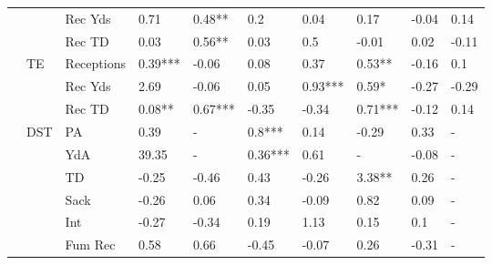 \documentclass[12pt]{article}
\begin{document}
\begin{table}[H]
\begin{adjustbox}{width =\textwidth}
\begin{tabular}{llllllllll}
{} &          &     Rec Yds &     0.71 &   0.48** &      0.2 &        0.04 &     0.17 &    -0.04 &      0.14 \\
{} &          &      Rec TD &     0.03 &   0.56** &     0.03 &         0.5 &    -0.01 &     0.02 &     -0.11 \\
{} &       TE &  Receptions &  0.39*** &    -0.06 &     0.08 &        0.37 &   0.53** &    -0.16 &       0.1 \\
{} &          &     Rec Yds &     2.69 &    -0.06 &     0.05 &     0.93*** &    0.59* &    -0.27 &     -0.29 \\
{} &          &      Rec TD &   0.08** &  0.67*** &    -0.35 &       -0.34 &  0.71*** &    -0.12 &      0.14 \\
{} &      DST &          PA &     0.39 &        - &   0.8*** &        0.14 &    -0.29 &     0.33 &         - \\
{} &          &         YdA &    39.35 &        - &  0.36*** &        0.61 &        - &    -0.08 &         - \\
{} &          &          TD &    -0.25 &    -0.46 &     0.43 &       -0.26 &   3.38** &     0.26 &         - \\
{} &          &        Sack &    -0.26 &     0.06 &     0.34 &       -0.09 &     0.82 &     0.09 &         - \\
{} &          &         Int &    -0.27 &    -0.34 &     0.19 &        1.13 &     0.15 &      0.1 &         - \\
{} &          &     Fum Rec &     0.58 &     0.66 &    -0.45 &       -0.07 &     0.26 &    -0.31 &         - \\
\bottomrule
\end{tabular}
\end{adjustbox}
\end{table}
\end{document}
